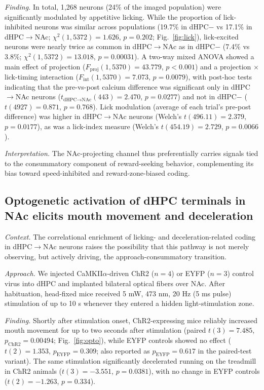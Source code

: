 \documentclass[11pt]{article}
\begin{document}
\textit{Finding.} In total, 1{,}268 neurons (24\% of the imaged population) were significantly modulated by appetitive licking. While the proportion of lick-inhibited neurons was similar across populations (19.7\% in dHPC$-$ vs 17.1\% in dHPC$\rightarrow$NAc; $\chi^2(1,5372)=1.626$, $p=0.202$; Fig.~\ref{fig:lick}), lick-excited neurons were nearly twice as common in dHPC$\rightarrow$NAc as in dHPC$-$ (7.4\% vs 3.8\%; $\chi^2(1,5372)=13.018$, $p=0.00031$). A two-way mixed ANOVA showed a main effect of projection ($F_{\text{proj}}(1,5370)=43.779$, $p<0.001$) and a projection $\times$ lick-timing interaction ($F_{\text{int}}(1,5370)=7.073$, $p=0.0079$), with post-hoc tests indicating that the pre-vs-post calcium difference was significant only in dHPC$\rightarrow$NAc neurons ($t_{\text{dHPC}\rightarrow\text{NAc}}(443)=2.470$, $p=0.0277$) and not in dHPC$-$ ($t(4927)=0.871$, $p=0.768$). Lick modulation (average of each trial's pre-post difference) was higher in dHPC$\rightarrow$NAc neurons (Welch's $t(496.11)=2.379$, $p=0.0177$), as was a lick-index measure (Welch's $t(454.19)=2.729$, $p=0.0066$).

\textit{Interpretation.} The NAc-projecting channel thus preferentially carries signals tied to the consummatory component of reward-seeking behavior, complementing its bias toward speed-inhibited and reward-zone-biased coding.

\subsection{Optogenetic activation of dHPC terminals in NAc elicits mouth movement and deceleration}

\textit{Context.} The correlational enrichment of licking- and deceleration-related coding in dHPC$\rightarrow$NAc neurons raises the possibility that this pathway is not merely observing, but actively driving, the approach-consummatory transition.

\textit{Approach.} We injected CaMKII$\alpha$-driven ChR2 ($n=4$) or EYFP ($n=3$) control virus into dHPC and implanted bilateral optical fibers over NAc. After habituation, head-fixed mice received 5 mW, 473 nm, 20 Hz (5 ms pulse) stimulation of up to 10 s whenever they entered a hidden light-stimulation zone.

\textit{Finding.} Shortly after stimulation onset, ChR2-expressing mice reliably increased mouth movement for up to two seconds after stimulation (paired $t(3)=7.485$, $p_{\text{ChR2}}=0.00494$; Fig.~\ref{fig:opto}), while EYFP controls showed no effect ($t(2)=1.353$, $p_{\text{EYFP}}=0.309$; also reported as $p_{\text{EYFP}}=0.617$ in the paired-test variant). The same stimulation significantly decelerated running on the treadmill in ChR2 animals ($t(3)=-3.551$, $p=0.0381$), with no change in EYFP controls ($t(2)=-1.263$, $p=0.334$).
\end{document}
